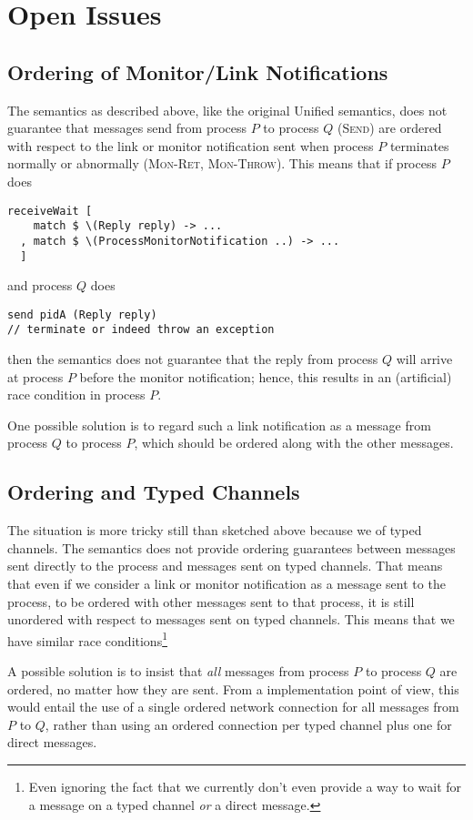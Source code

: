 \documentclass{article}
\begin{document}
\section{Open Issues}

\subsection{Ordering of Monitor/Link Notifications}

The semantics as described above, like the original Unified semantics, does not
guarantee that messages send from process $P$ to process $Q$ (\textsc{Send})
are ordered with respect to the link or monitor notification sent when process
$P$ terminates normally or abnormally (\textsc{Mon-Ret}, \textsc{Mon-Throw}). This means that if process $P$ does

\begin{lstlisting}
receiveWait [
    match $ \(Reply reply) -> ...
  , match $ \(ProcessMonitorNotification ..) -> ...
  ]
\end{lstlisting}

and process $Q$ does

\begin{lstlisting}
send pidA (Reply reply)
// terminate or indeed throw an exception
\end{lstlisting}

then the semantics does not guarantee that the reply from process $Q$ will
arrive at process $P$ before the monitor notification; hence, this results in
an (artificial) race condition in process $P$.

One possible solution is to regard such a link notification as a message from
process $Q$ to process $P$, which should be ordered along with the other
messages.

\subsection{Ordering and Typed Channels}

The situation is more tricky still than sketched above because we of typed
channels. The semantics does not provide ordering guarantees between messages
sent directly to the process and messages sent on typed channels. That means
that even if we consider a link or monitor notification as a message sent to
the process, to be ordered with other messages sent to that process, it is
still unordered with respect to messages sent on typed channels. This means
that we have similar race conditions\footnote{Even ignoring the fact that we
currently don't even provide a way to wait for a message on a typed channel
\emph{or} a direct message.} 

A possible solution is to insist that \emph{all} messages from process $P$ to
process $Q$ are ordered, no matter how they are sent. From a implementation
point of view, this would entail the use of a single ordered network connection
for all messages from $P$ to $Q$, rather than using an ordered connection per
typed channel plus one for direct messages.



\end{document}
